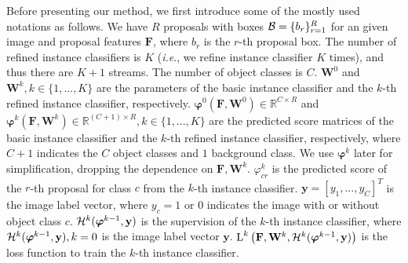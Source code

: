 \documentclass[10pt,journal,compsoc]{IEEEtran}
\def\ie{\emph{i.e}.} \def\Ie{\emph{I.e}.}
\begin{document}
Before presenting our method,
we first introduce some of the mostly used notations as follows.
We have $R$ proposals with boxes ${\cal B} = \{b_{r}\}_{r=1}^{R}$ for an given image
and proposal features $\mathbf{F}$,
where $b_{r}$ is the $r$-th proposal box.
The number of refined instance classifiers is $K$ (\ie, we refine instance classifier $K$ times), and thus there are $K+1$ streams.
The number of object classes is $C$.
$\mathbf{W}^{0}$ and $\mathbf{W}^{k}, k \in \{1, ..., K\}$ are the parameters of the basic instance classifier and the $k$-th refined instance classifier, respectively.
$\bm{\varphi}^{0}(\mathbf{F}, \mathbf{W}^{0}) \in \mathbb{R}^{C \times R}$ and $\bm{\varphi}^{k}(\mathbf{F}, \mathbf{W}^{k}) \in \mathbb{R}^{(C+1) \times R}, k \in \{1, ..., K\}$ are the predicted score matrices
of the basic instance classifier and the $k$-th refined instance classifier, respectively,
where $C+1$ indicates the $C$ object classes and $1$ background class.
We use $\bm{\varphi}^{k}$ later for simplification, dropping the dependence on $\mathbf{F}, \mathbf{W}^{k}$.
$\varphi^{k}_{cr}$ is the predicted score of the $r$-th proposal for class $c$ from the $k$-th instance classifier.
$\mathbf{y} = [y_{1}, ..., y_{C}]^{T}$ is the image label vector,
where $y_{c}=1$ or $0$ indicates the image with or without object class $c$.
${\cal H}^{k}(\bm{\varphi}^{k-1}, \mathbf{y})$ is the supervision of the $k$-th instance classifier,
where ${\cal H}^{k}(\bm{\varphi}^{k-1}, \mathbf{y}), k=0$ is the image label vector $\mathbf{y}$.
$\textup{L}^{k}\left( \mathbf{F}, \mathbf{W}^{k}, {\cal H}^{k}(\bm{\varphi}^{k-1}, \mathbf{y}) \right)$ is the loss function to train the $k$-th instance classifier.
\end{document}
